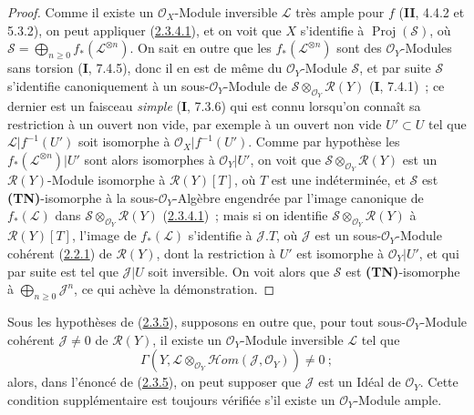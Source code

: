 \begin{proof}
Comme il existe un $\mathcal O_X$-Module inversible $\mathcal L$ très
ample pour $f$ (\textbf{II}, 4.4.2 et 5.3.2), on peut appliquer
(\hyperref[III.2.3.4.1-fr]{2.3.4.1}), et on voit que $X$ s'identifie à
$\operatorname{Proj}(\mathcal S)$, où
$\mathcal S=\bigoplus_{n\geq0}f_*(\mathcal L^{\otimes n})$. On sait en
outre que les $f_*(\mathcal L^{\otimes n})$ sont des
$\mathcal O_Y$-Modules sans torsion (\textbf{I}, 7.4.5), donc il en est de même du
$\mathcal O_Y$-Module $\mathcal S$, et par suite $\mathcal S$ s'identifie
canoniquement à un sous-$\mathcal O_Y$-Module de
$\mathcal S\otimes_{\mathcal O_Y}\mathcal R(Y)$ (\textbf{I}, 7.4.1)~; ce dernier
est un faisceau \emph{simple} (\textbf{I}, 7.3.6) qui est connu lorsqu'on connaît
sa restriction à un ouvert non vide, par exemple à un ouvert non vide
$U'\subset U$ tel que $\mathcal L|f^{-1}(U')$ soit isomorphe à
$\mathcal O_X|f^{-1}(U')$. Comme par hypothèse les
$f_*(\mathcal L^{\otimes n})|U'$ sont alors isomorphes à
$\mathcal O_Y|U'$, on voit que
$\mathcal S\otimes_{\mathcal O_Y}\mathcal R(Y)$ est un
$\mathcal R(Y)$-Module isomorphe à $\mathcal R(Y)[T]$, où $T$ est une
indéterminée, et $\mathcal S$ est \textbf{(TN)}-isomorphe à la
sous-$\mathcal O_Y$-Algèbre engendrée par l'image canonique de
$f_*(\mathcal L)$ dans $\mathcal S\otimes_{\mathcal O_Y}\mathcal R(Y)$
(\hyperref[III.2.3.4.1-fr]{2.3.4.1})~; mais si on identifie $\mathcal S\otimes_{\mathcal O_Y}\mathcal R(Y)$
à $\mathcal R(Y)[T]$, l'image de $f_*(\mathcal L)$ s'identifie à
$\mathcal J.T$, où $\mathcal J$ est un sous-$\mathcal O_Y$-Module
cohérent (\hyperref[III.2.2.1-fr]{2.2.1}) de $\mathcal R(Y)$, dont la
restriction à $U'$ est isomorphe à $\mathcal O_Y|U'$, et qui par suite
est tel que $\mathcal J|U$ soit inversible. On voit alors que $\mathcal S$
est \textbf{(TN)}-isomorphe à $\bigoplus_{n\geq0}\mathcal J^n$, ce qui
achève la démonstration.
\end{proof}

\begin{corollary}[2.3.6]
\label{III.2.3.6-fr}
Sous les hypothèses de \textup{(\hyperref[III.2.3.5-fr]{2.3.5})}, supposons en
outre que, pour tout sous-$\mathcal O_Y$-Module cohérent
$\mathcal J\neq0$ de $\mathcal R(Y)$, il existe un
$\mathcal O_Y$-Module inversible $\mathcal L$ tel que
\[
\Gamma(Y,\mathcal L\otimes_{\mathcal O_Y}
\mathcal{H}om(\mathcal J,\mathcal O_Y))\neq0~;
\]
alors, dans l'énoncé de \textup{(\hyperref[III.2.3.5-fr]{2.3.5})}, on peut supposer
que $\mathcal J$ est un Idéal de $\mathcal O_Y$. Cette condition
supplémentaire est toujours vérifiée s'il existe un
$\mathcal O_Y$-Module ample.
\end{corollary}

